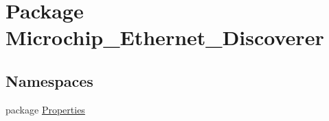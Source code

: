 \hypertarget{namespace_microchip___ethernet___discoverer}{}\section{Package Microchip\+\_\+\+Ethernet\+\_\+\+Discoverer}
\label{namespace_microchip___ethernet___discoverer}
\subsection*{Namespaces}
\begin{DoxyCompactItemize}
\item 
package \hyperlink{namespace_microchip___ethernet___discoverer_1_1_properties}{Properties}
\end{DoxyCompactItemize}
